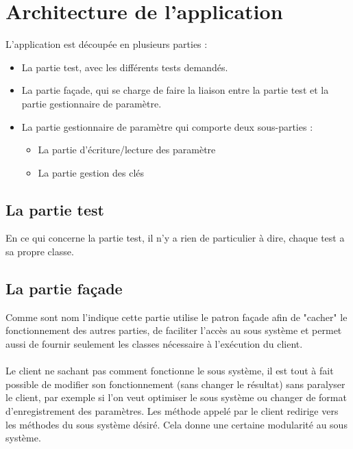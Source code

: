 \documentclass[12pt]{article}
\begin{document}
\newpage
\tableofcontents
\newpage

\section{Architecture de l'application}
\label{sec:arch_app}

	L'application est découpée en plusieurs parties : 
	\begin{itemize}
		\item La partie test, avec les différents tests demandés.
		\item La partie façade, qui se charge de faire la liaison entre la partie test et la partie gestionnaire de paramètre.
		\item La partie gestionnaire de paramètre qui comporte deux sous-parties :
		\begin{itemize}
			\item La partie d'écriture/lecture des paramètre
			\item La partie gestion des clés
		\end{itemize}
	\end{itemize}
	\subsection{La partie test}
	
	En ce qui concerne la partie test, il n'y a rien de particulier à dire, chaque test a sa propre classe.
	
	\subsection{La partie façade}

	Comme sont nom l'indique cette partie utilise le patron façade afin de "cacher" le fonctionnement des autres parties, de faciliter l'accès au sous système et permet aussi de fournir seulement les classes nécessaire à l'exécution du client.
	
	\paragraph{}
	Le client ne sachant pas comment fonctionne le sous système, il est tout à fait possible de modifier son fonctionnement (sans changer le résultat) sans paralyser le client, par exemple si l'on veut optimiser le sous système ou changer de format d'enregistrement des paramètres. Les  méthode appelé par le client redirige vers les méthodes du sous système désiré. Cela donne une certaine modularité au sous système.
	
\end{document}
